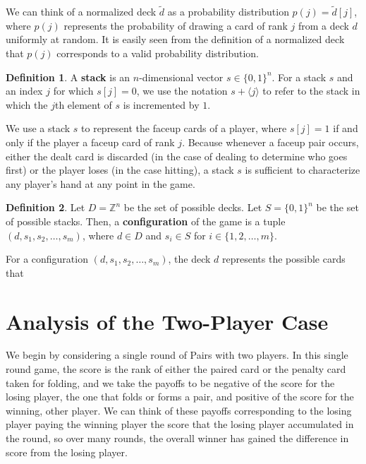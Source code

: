 \documentclass{article}
\theoremstyle{definition}
\newtheorem{definition}{Definition}
\newcounter{a}
\begin{document}
We can think of a normalized deck $\tilde{d}$ as a probability distribution $p(j) = \tilde{d}[j]$, where $p(j)$ represents the probability of drawing a card of rank $j$ from a deck $d$ uniformly at random. It is easily seen from the definition of a normalized deck that $p(j)$ corresponds to a valid probability distribution.

\begin{definition}
A \textbf{stack} is an $n$-dimensional vector $s \in \{0,1\}^n$. For a stack $s$ and an index $j$ for which $s[j] = 0$, we use the notation $s+\langle j \rangle$ to refer to the stack in which the $j$th element of $s$ is incremented by $1$. 
\end{definition}

We use a stack $s$ to represent the faceup cards of a player, where $s[j] = 1$ if and only if the player a faceup card of rank $j$. Because whenever a faceup pair occurs, either the dealt card is discarded (in the case of dealing to determine who goes first) or the player loses (in the case hitting), a stack $s$ is sufficient to characterize any player's hand at any point in the game.

\begin{definition}
Let $D = \mathbb{Z}^n$ be the set of possible decks. Let $S = \{0,1\}^n$ be the set of possible stacks. Then, a \textbf{configuration} of the game is a tuple $(d,s_1,s_2,\dots,s_m)$, where $d \in D$ and $s_i \in S$ for $i \in \{1,2,\dots,m\}$.
\end{definition}

For a configuration $(d,s_1,s_2,\dots,s_m)$, the deck $d$ represents the possible cards that

\section{Analysis of the Two-Player Case}

We begin by considering a single round of Pairs with two players. In this single round game, the score is the rank of either the paired card or the penalty card taken for folding, and we take the payoffs to be negative of the score for the losing player, the one that folds or forms a pair, and positive of the score for the winning, other player. We can think of these payoffs corresponding to the losing player paying the winning player the score that the losing player accumulated in the round, so over many rounds, the overall winner has gained the difference in score from the losing player.
\end{document}

